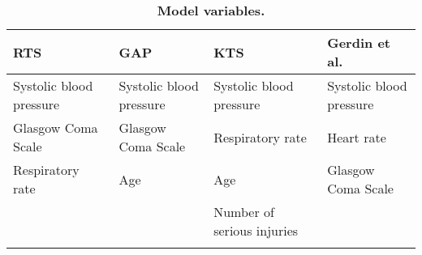 \begin{table}[!ht]
\centering
\caption{\bf Model variables.} 
\label{table:variables_table}
\begin{adjustbox}{max width = \linewidth} 
\begin{threeparttable} 
\begin{tabular} 
{llll}
  \toprule
RTS & GAP & KTS & Gerdin et al. \\ 
  \midrule
Systolic blood pressure & Systolic blood pressure & Systolic blood pressure & Systolic blood pressure \\ 
  Glasgow Coma Scale & Glasgow Coma Scale & Respiratory rate & Heart rate \\ 
  Respiratory rate & Age & Age & Glasgow Coma Scale \\ 
   &  & Number of serious injuries &  \\ 
   \bottomrule
\addlinespace 
\end{tabular} 
\end{threeparttable} 
\end{adjustbox}
\end{table}

